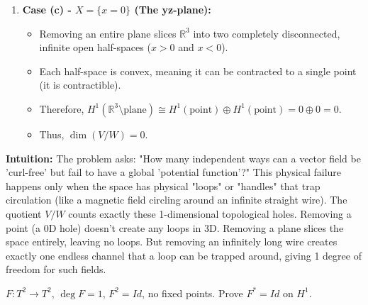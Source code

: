 \begin{solution}
\begin{enumerate}
    \medskip
    \item \textbf{Case (c) - $X = \{x=0\}$ (The yz-plane):}
    \begin{itemize}
        \item Removing an entire plane slices $\mathbb{R}^3$ into two completely disconnected, infinite open half-spaces ($x>0$ and $x<0$).
        \item Each half-space is convex, meaning it can be contracted to a single point (it is contractible).
        \item Therefore, $H^1(\mathbb{R}^3 \setminus \text{plane}) \cong H^1(\text{point}) \oplus H^1(\text{point}) = 0 \oplus 0 = 0$.
        \item Thus, $\dim(V/W) = 0$.
    \end{itemize}
\end{enumerate}

\medskip
\textbf{Intuition:}
The problem asks: "How many independent ways can a vector field be 'curl-free' but fail to have a global 'potential function'?" This physical failure happens only when the space has physical "loops" or "handles" that trap circulation (like a magnetic field circling around an infinite straight wire). 
The quotient $V/W$ counts exactly these 1-dimensional topological holes.
Removing a point (a 0D hole) doesn't create any loops in 3D. Removing a plane slices the space entirely, leaving no loops. But removing an infinitely long wire creates exactly one endless channel that a loop can be trapped around, giving 1 degree of freedom for such fields.
\end{solution}

\begin{exercise}
\label{geometry:2019:8}
$F: T^2 \to T^2$, $\deg F = 1$, $F^2 = Id$, no fixed points. Prove $F^* = Id$ on $H^1$.
\end{exercise}

